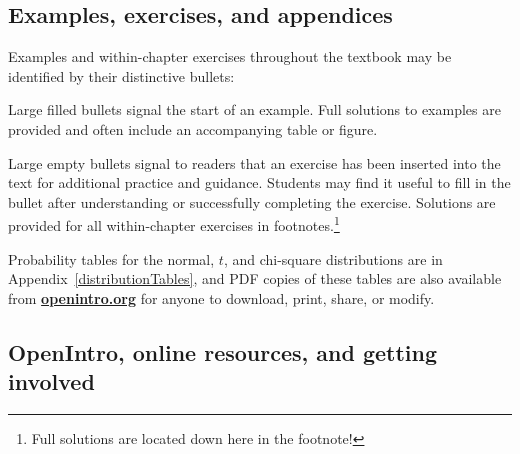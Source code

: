 \subsection*{Examples, exercises, and appendices}

Examples and within-chapter exercises throughout the textbook may be identified by their distinctive bullets:

\begin{example}{Large filled bullets signal the start of an example.}
Full solutions to examples are provided and often include an accompanying table or figure.
 \end{example}

\begin{exercise}
Large empty bullets signal to readers that an exercise has been inserted into the text for additional practice and guidance. Students may find it useful to fill in the bullet after understanding or successfully completing the exercise. Solutions are provided for all within-chapter exercises in footnotes.\footnote{Full solutions are located down here in the footnote!}
\end{exercise}





Probability tables for the normal, $t$, and chi-square distributions are in Appendix~\ref{distributionTables}, and PDF copies of these tables are also available from \href{http://www.openintro.org}{\color{black}\textbf{openintro.org}} for anyone to download, print, share, or modify.

\subsection*{OpenIntro, online resources, and getting involved}

